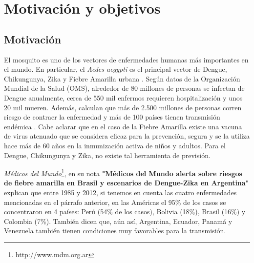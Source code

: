 %
%
%

\chapter{Motivación y objetivos}


\justifying
\section{Motivación}

  \par El mosquito es uno de los vectores de enfermedades humanas más importantes
    en el mundo. En particular, el \textit{Aedes aegypti} es el principal vector
    de Dengue, Chikungunya, Zika y Fiebre Amarilla urbana \cite{dengue_principal}.
    Según datos de la Organización Mundial de la Salud (OMS), alrededor de 80 millones de
    personas se infectan de Dengue anualmente, cerca de 550 mil enfermos requieren hospitalización y
    unos 20 mil mueren. Además, calculan que más de 2.500 millones de personas corren
    riesgo de contraer la enfermedad y más de 100 países tienen transmisión endémica
    \cite{directices_ministerio}.
    Cabe aclarar que en el caso de la Fiebre Amarilla existe una vacuna de virus
    atenuado que se considera eficaz para la prevención, segura
    y se la utiliza hace más de 60 años en la inmunización activa de niños y
    adultos. Para el Dengue, Chikungunya y Zika,
    no existe tal herramienta de previsión.

  \par \textit{Médicos del Mundo}\footnote{http://www.mdm.org.ar}, en su nota
    \textbf{"Médicos del Mundo alerta sobre riesgos de fiebre amarilla en Brasil y escenarios de Dengue-Zika en Argentina"}
    explican que entre 1985 y 2012, si tenemos en cuenta las cuatro enfermedades
    mencionadas en el párrafo anterior, en las Américas el 95\% de los casos se concentraron en
    4 países: Perú (54\% de los casos), Bolivia (18\%), Brasil (16\%) y Colombia (7\%).
    También dicen que, aún así, Argentina, Ecuador, Panamá y Venezuela también tienen condiciones
    muy favorables para la transmisión.



